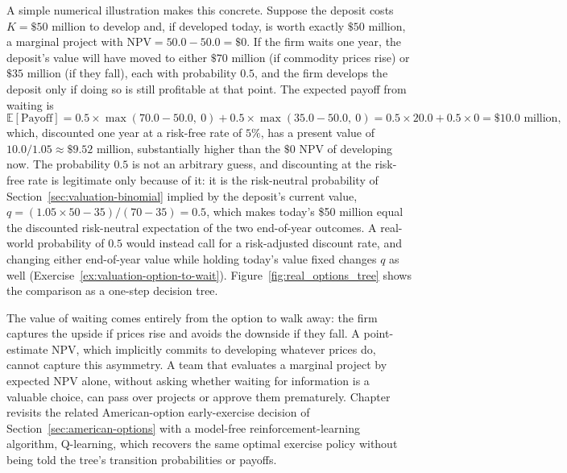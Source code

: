 \documentclass[../ai_in_finance]{subfiles}
\begin{document}
A simple numerical illustration makes this concrete. Suppose the deposit costs $K = \$50$ million to develop and, if developed today, is worth exactly $\$50$ million, a marginal project with $\text{NPV} = 50.0 - 50.0 = \$0$. If the firm waits one year, the deposit's value will have moved to either $\$70$ million (if commodity prices rise) or $\$35$ million (if they fall), each with probability $0.5$, and the firm develops the deposit only if doing so is still profitable at that point.
The expected payoff from waiting is
\begin{equation*}
\mathbb{E}[\text{Payoff}] = 0.5 \times \max(70.0 - 50.0,\ 0) + 0.5 \times \max(35.0 - 50.0,\ 0) = 0.5 \times 20.0 + 0.5 \times 0 = \$10.0 \text{ million},
\end{equation*}
which, discounted one year at a risk-free rate of $5\%$, has a present value of $10.0/1.05 \approx \$9.52$ million, substantially higher than the $\$0$ NPV of developing now. The probability $0.5$ is not an arbitrary guess, and discounting at the risk-free rate is legitimate only because of it: it is the risk-neutral probability of Section~\ref{sec:valuation-binomial} implied by the deposit's current value, $q = (1.05 \times 50 - 35)/(70 - 35) = 0.5$, which makes today's \$50 million equal the discounted risk-neutral expectation of the two end-of-year outcomes. A real-world probability of $0.5$ would instead call for a risk-adjusted discount rate, and changing either end-of-year value while holding today's value fixed changes $q$ as well (Exercise~\ref{ex:valuation-option-to-wait}). Figure~\ref{fig:real_options_tree} shows the comparison as a one-step decision tree.

The value of waiting comes entirely from the option to walk away: the firm captures the upside if prices rise and avoids the downside if they fall. A point-estimate NPV, which implicitly commits to developing whatever prices do, cannot capture this asymmetry.
A team that evaluates a marginal project by expected NPV alone, without asking whether waiting for information is a valuable choice, can pass over projects or approve them prematurely. Chapter~ revisits the related American-option early-exercise decision of Section~\ref{sec:american-options} with a model-free reinforcement-learning algorithm, Q-learning, which recovers the same optimal exercise policy without being told the tree's transition probabilities or payoffs.
\end{document}
